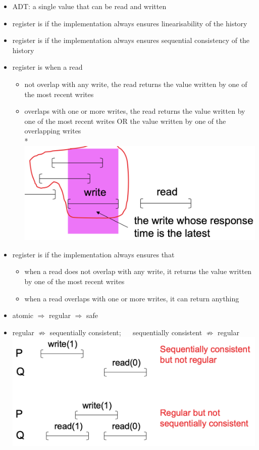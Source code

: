 \documentclass[10pt, landscape]{article}
\begin{document}
\begin{multicols*}{3}
  \begin{itemize}
    \item {} ADT: a single value that can be read and written
    \item register is  if the implementation always ensures linearisability of the history
    \item register is  if the implementation always ensures sequential consistency of the history
    \item register is  when a read
      \begin{itemize}
        \item not overlap with any write, the read returns the value written by one of the most recent writes
        \item overlaps with one or more writes, the read returns the value written by one of the most recent writes OR the value written by one of the overlapping writes
          \\* \includegraphics[width=0.5\linewidth]{cs4231-register-recent-writes.png} 
      \end{itemize}
    \item register is  if the implementation always ensures that
      \begin{itemize}
        \item when a read does not overlap with any write, it returns the value written by one of the most recent writes
        \item when a read overlaps with one or more writes, it can return anything
      \end{itemize}
    \item \attention atomic $\Rightarrow$ regular $\Rightarrow$ safe
    \item regular $\not\Rightarrow$ sequentially consistent; $\quad$ sequentially consistent $\not\Rightarrow$ regular
      \includegraphics[width=0.6\linewidth]{cs4231-register-regular-seq-consistent.png} 
  \end{itemize}


\end{multicols*}
\end{document}
